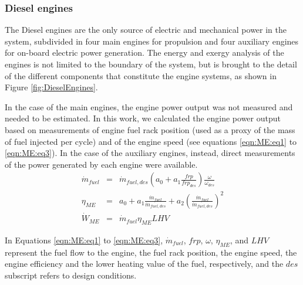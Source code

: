 \documentclass[preprint,12pt]{elsarticle}
\begin{document}
\subsubsection{Diesel engines}

The Diesel engines are the only source of electric and mechanical power in the system, subdivided in four main engines for propulsion and four auxiliary engines for on-board electric power generation. The energy and exergy analysis of the engines is not limited to the boundary of the system, but is brought to the detail of the different components that constitute the engine systems, as shown in Figure \ref{fig:DieselEngines}. 

In the case of the main engines, the engine power output was not measured and needed to be estimated. In this work, we calculated the engine power output based on measurements of engine fuel rack position (used as a proxy of the mass of fuel injected per cycle) and of the engine speed (see equations \ref{eqn:ME:eq1} to \ref{eqn:ME:eq3}). In the case of the auxiliary engines, instead, direct measurements of the power generated by each engine were available. 
\begin{eqnarray}
\dot{m}_{fuel} & = & \dot{m}_{fuel,des} \left(a_0 + a_1 \frac{frp}{frp_{des}}\right) \frac{\omega}{\omega_{des}} \label{eqn:ME:eq1} \\
\eta_{ME} & = & a_0 + a_1 \frac{\dot{m}_{fuel}}{\dot{m}_{fuel,des}} + a_2 \left( \frac{\dot{m}_{fuel}}{\dot{m}_{fuel,des}} \right)^2 \label{eqn:ME:eq2} \\
\dot{W}_{ME} & = & \dot{m}_{fuel} \eta_{ME} LHV \label{eqn:ME:eq3}
\end{eqnarray}



In Equations \ref{eqn:ME:eq1} to \ref{eqn:ME:eq3}, $\dot{m}_{fuel}$, $frp$, $\omega$, $\eta_{ME}$, and $LHV$ represent the fuel flow to the engine, the fuel rack position, the engine speed, the engine efficiency and the lower heating value of the fuel, respectively, and the $des$ subscript refers to design conditions. 
\end{document}
